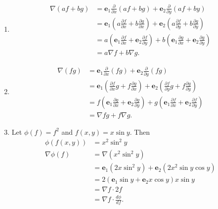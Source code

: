 \begin{example}[For $n = 2$]
    \begin{enumerate}
        \item 
            \begin{align*}
                \nabla(af + bg) &= \bm e_1 \frac{\partial}{\partial x} (af + bg) + \bm e_2 \frac{\partial}{\partial y} (af + by) \\
                                &= \bm e_1 \left( a \frac{\partial f}{\partial x} + b \frac{\partial g}{\partial x} \right) + \bm e_2 \left( a \frac{\partial f}{\partial y} + b \frac{\partial g}{\partial y} \right) \\
                                &= a \left( \bm e_1 \frac{\partial f}{\partial x} + \bm e_2 \frac{\partial f}{\partial y} \right) + b \left( \bm e_1 \frac{\partial g}{\partial x} + \bm e_2 \frac{\partial g}{\partial y} \right) \\
                                &= a \nabla f + b \nabla g.
            \end{align*}

        \item
            \begin{align*}
                \nabla(fg) &= \bm e_1 \frac{\partial}{\partial x} (fg) + \bm e_2 \frac{\partial}{\partial y} (fg) \\
                           &= \bm e_1 \left( \frac{\partial f}{\partial x} g + f \frac{\partial g}{\partial x} \right) + \bm e_2 \left( \frac{\partial f}{\partial y} g + f \frac{\partial g}{\partial y} \right) \\
                           &= f \left( \bm e_1 \frac{\partial g}{\partial x} + \bm e_2 \frac{\partial g}{\partial y} \right) + g \left( \bm e_1 \frac{\partial f}{\partial x}  + \bm e_2 \frac{\partial f}{\partial y} \right) \\
                           &= \nabla f g + f \nabla g.
            \end{align*}

        \item Let $\phi(f) = f^2$ and $f(x, y) = x\sin{y}$. Then
            \begin{align*}
                \phi(f(x, y)) &= x^2\sin^2{y} \\
                \nabla \phi(f) &= \nabla(x^2\sin^2{y}) \\
                               &= \bm e_1 (2x\sin^2y) + \bm e_2 (2x^2\sin y\cos y) \\
                               &= 2 (\bm e_1 \sin{y} + \bm e_2 x \cos{y}) x\sin{y} \\
                               &= \nabla f \cdot 2f \\
                               &= \nabla f \cdot \frac{d\phi}{df}.
            \end{align*}
    \end{enumerate}
\end{example}

